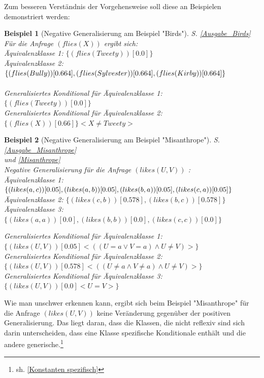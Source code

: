 \documentclass[a4paper, 11pt]{book}
\newtheorem{Bsp}{Beispiel}[section]
\begin{document}
Zum besseren Verständnis der Vorgehensweise soll diese an Beispielen demonstriert werden:
\begin{Bsp}[Negative Generalisierung am Beispiel "{}Birds"{}]
	S. \ref{Ausgabe_Birds}
	\label{Bsp:Neg_Gen_Birds} \\Für die Anfrage $ (flies(X)) $ ergibt sich: \\
	
	\noindent
	Äquivalenzklasse 1: $\{(flies(Tweety))[0.0]\}$\\
	Äquivalenzklasse 2: $\{(flies(Bully))[0.664], (flies(Sylvester))[0.664],\\ (flies(Kirby))[0.664]\}$\\
	\\
Generalisiertes Konditional für Äquivalenzklasse 1:\\ $\{(flies(Tweety))[0.0]\}$\\
Generalisiertes Konditional für Äquivalenzklasse 2:\\ $\{(flies(X))[0.66]\} <X \neq Tweety>$\\
\end{Bsp}
 

\begin{Bsp}[Negative Generalisierung am Beispiel "{}Misanthrope"{}]
	S. \ref{Ausgabe_Misanthrope} \\ und \ref{Misanthrope}\\
	Negative Generalisierung für die Anfrage  $ (likes(U,V))$ :\\
	
	\noindent
	Äquivalenzklasse 1: $ \{(likes(a,c))[0.05], (likes(a,b))[0.05], (likes(b,a))[0.05],\\ (likes(c,a))[0.05]\} $\\
	Äquivalenzklasse 2: $ \{(likes(c,b))[0.578], (likes(b,c))[0.578]\} $\\
	Äquivalenzklasse 3: $ \{ (likes(a,a))[0.0], (likes(b,b))[0.0], (likes(c,c))[0.0]\} $
	
	
	\noindent
		Generalisiertes Konditional für Äquivalenzklasse 1:\\ $ \{(likes(U,V))[0.05] <((U = a \lor V = a) \land U \neq V )>\} $\\
		Generalisiertes Konditional für Äquivalenzklasse 2: \\$ \{(likes(U,V))[0.578] <((U \neq a \land V \neq a) \land U \neq V)>\} $\\	
		Generalisiertes Konditional für Äquivalenzklasse 3:\\ $ \{(likes(U,V))[0.0] <U=V>\} $\\
	\end{Bsp}
Wie man unschwer erkennen kann, ergibt sich beim Beispiel "{}Misanthrope"{} für die Anfrage $ (likes(U,V))$  keine Veränderung gegenüber der positiven Generalisierung. Das liegt daran, dass die Klassen, die nicht reflexiv sind sich darin unterscheiden, dass eine Klasse spezifische Konditionale enthält und die andere generische.\footnote{sh. \ref{Konstanten spezifisch}} 
\end{document}
